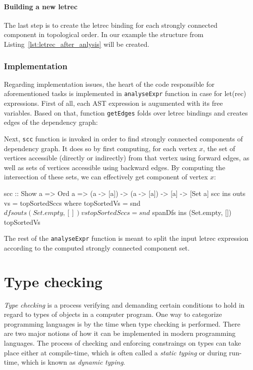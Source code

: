\documentclass[12pt,a4paper]{report}
\begin{document}
\subsubsection{Building a new letrec}
The last step is to create the letrec binding for each strongly
connected component in topological order. In our example the structure from
Listing~\ref{lst:letrec_after_anlysis} will be created.


\subsection{Implementation}
Regarding implementation issues, the heart of the code responsible for
aforementioned tasks is implemented in \texttt{analyseExpr} function in case
for let(rec) expressions. First of all, each AST expression is
augumented with its free variables. Based on that, function \texttt{getEdges}
folds over letrec bindings and creates edges of the dependency graph:

\vspace*{0.2in}

Next, \texttt{scc} function is invoked in order to find strongly connected
components of dependency graph. It does so by first computing, for each vertex
$x$, the set of vertices accessible (directly or indirectly) from that vertex
using forward edges, as well as sets of vertices accessible using backward
edges. By computing the intersection of these sets, we can effectively get
component of vertex $x$:

\vspace*{0.2in}
\begin{code}[style=haskell]
scc :: Show a => Ord a => (a -> [a]) -> (a -> [a]) -> [a] -> [Set a]
scc ins outs vs = topSortedSccs
    where
        topSortedVs = snd $ dfs outs (Set.empty, []) vs
        topSortedSccs = snd $ spanDfs ins (Set.empty, []) topSortedVs
\end{code}

The rest of the \texttt{analyseExpr} function is meant to split the input
letrec expression according to the computed strongly connected
component set.

\chapter{Type checking}
\textit{Type checking} is a process verifying and demanding certain conditions
to hold in regard to types of objects in a computer program. One way to
categorize programming languages is by the time when type checking is
performed. There are two major notions of how it can be implemented in modern
programming languages. The process of checking and enforcing constraings on
types can take place either at compile-time, which is often called a
\textit{static typing} or during run-time, which is known as \textit{dynamic
typing}.
\end{document}
